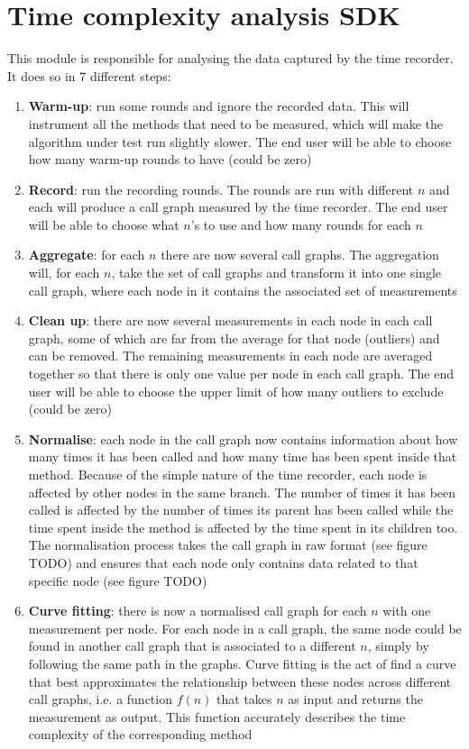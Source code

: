 \section{Time complexity analysis SDK}
This module is responsible for analysing the data captured by the time recorder. It does so in 7 different steps:
\begin{enumerate}
  \item \textbf{Warm-up}: run some rounds and ignore the recorded data. This will instrument all the methods that need to be measured, which will make the algorithm under test run slightly slower. The end user will be able to choose how many warm-up rounds to have (could be zero)
  \item \textbf{Record}: run the recording rounds. The rounds are run with different $n$ and each will produce a call graph measured by the time recorder. The end user will be able to choose what $n$'s to use and how many rounds for each $n$
  \item \textbf{Aggregate}: for each $n$ there are now several call graphs. The aggregation will, for each $n$, take the set of call graphs and transform it into one single call graph, where each node in it contains the associated set of measurements
  \item \textbf{Clean up}: there are now several measurements in each node in each call graph, some of which are far from the average for that node (outliers) and can be removed. The remaining measurements in each node are averaged together so that there is only one value per node in each call graph. The end user will be able to choose the upper limit of how many outliers to exclude (could be zero)
  \item \textbf{Normalise}: each node in the call graph now contains information about how many times it has been called and how many time has been spent inside that method. Because of the simple nature of the time recorder, each node is affected by other nodes in the same branch. The number of times it has been called is affected by the number of times its parent has been called while the time spent inside the method is affected by the time spent in its children too. The normalisation process takes the call graph in raw format (see figure TODO) and ensures that each node only contains data related to that specific node (see figure TODO)
  \item \textbf{Curve fitting}: there is now a normalised call graph for each $n$
        with one measurement per node. For each node in a call graph, the same node could be found in another call graph that is associated to a different $n$, simply by following the same path in the graphs. Curve fitting is the act of find a curve that best approximates the relationship between these nodes across different call graphs, i.e. a function $f(n)$ that takes $n$ as input and returns the measurement as output. This function accurately describes the time complexity of the corresponding method

\end{enumerate}
